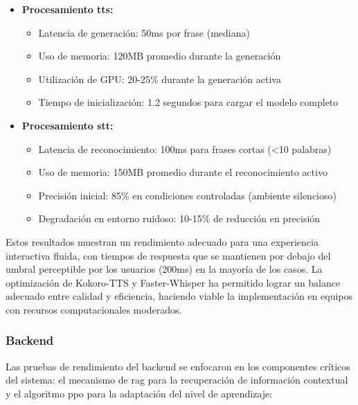 \begin{itemize}
    \item \textbf{Procesamiento \gls{tts}:}
    \begin{itemize}
        \item Latencia de generación: 50ms por frase (mediana)
        \item Uso de memoria: 120MB promedio durante la generación
        \item Utilización de GPU: 20-25\% durante la generación activa
        \item Tiempo de inicialización: 1.2 segundos para cargar el modelo completo
    \end{itemize}

    \item \textbf{Procesamiento \gls{stt}:}
    \begin{itemize}
        \item Latencia de reconocimiento: 100ms para frases cortas (<10 palabras)
        \item Uso de memoria: 150MB promedio durante el reconocimiento activo
        \item Precisión inicial: 85\% en condiciones controladas (ambiente silencioso)
        \item Degradación en entorno ruidoso: 10-15\% de reducción en precisión
    \end{itemize}
\end{itemize}

Estos resultados muestran un rendimiento adecuado para una experiencia interactiva fluida, con tiempos de respuesta que se mantienen por debajo del umbral perceptible por los usuarios (200ms) en la mayoría de los casos. La optimización de Kokoro-TTS y Faster-Whisper ha permitido lograr un balance adecuado entre calidad y eficiencia, haciendo viable la implementación en equipos con recursos computacionales moderados.



\subsubsection{Backend}
\label{subsubsec:backend-rendimiento}

Las pruebas de rendimiento del backend se enfocaron en los componentes críticos del sistema: el mecanismo de \gls{rag} para la recuperación de información contextual y el algoritmo \gls{ppo} para la adaptación del nivel de aprendizaje:

